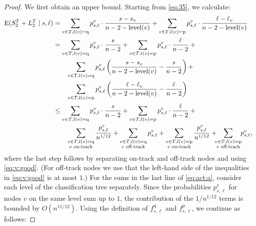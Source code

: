 \documentclass[prodmode,acmtalg]{acmsmall}
\newcommand{\E}{\textnormal{\textrm{E}}}
\begin{document}
\begin{proof}
    
    We first obtain an upper bound. Starting from \eqref{eq:35}, we
    calculate:
    \begin{align}
    \E(S_2^T + L_2^T \mid s, \ell) &=\sum_{v \in T, l(v) = \text{q}}
	p^v_{s,\ell}\cdot \frac{s - s_v}{n
	- 2 - \lv{v}}+ \sum_{v \in T, l(v) = \text{p}} p^v_{s,\ell} \cdot \frac{\ell -
	\ell_v}{n - 2 -
    \lv{v}}\notag\\
    &=\sum_{v \in T, l(v) = \text{q}}
	p^v_{s,\ell}\cdot\frac{s}{n
	- 2}+ \sum_{v \in T, l(v) = \text{p}} p^v_{s,\ell}
        \cdot\frac{\ell}{n - 2} {}+{}\notag\\ &\quad\quad\sum_{v \in T, l(v) = \text{q}}
	p^v_{s,\ell}\left( \frac{s - s_v}{n
	- 2 - \lv{v}} - \frac{s}{n-2} \right) + \notag\\ &\quad\quad\sum_{v \in T, l(v) = \text{p}} p^v_{s,\ell}
	\left( \frac{\ell -
    \ell_v}{n - 2 -
    \lv{v}}-\frac{\ell}{n-2}\right) \notag\\
	&\leq \sum_{v \in T, l(v) = \text{q}}
	p^v_{s,\ell}\cdot\frac{s}{n
	- 2}+ \sum_{v \in T, l(v) = \text{p}} p^v_{s,\ell}\cdot
        \frac{\ell}{n - 2}{}+{} \notag\\&\quad\quad\sum_{\substack{v \in T, l(v) = \text{q}\\v \text{ on-track}}}
    \frac{p^v_{s,\ell}}{n^{1/12}} + 
	\sum_{\substack{v \in T, l(v) = \text{q}\\v \text{ off-track}}} p^v_{s,\ell} + \sum_{\substack{v \in T, l(v) = \text{p}\\v \text{ on-track}}} 
    \frac{p^v_{s,
    \ell}}{n^{1/12}} +\!\!\! 
    \sum_{\substack{v \in T, l(v) = \text{p}\\v \text{ off-track}}} \!\!p^v_{s,\ell}, \label{eq:act:a}
\end{align}
where the last step follows by separating on-track and off-track nodes and using
\eqref{eq:v:good}.  (For off-track nodes we use that the left-hand side of the
inequalities in \eqref{eq:v:good} is at most $1$.) For the sums in the last line
of \eqref{eq:act:a}, consider each level of the classification tree separately.
Since the probabilities $p^v_{s,\ell}$ for nodes $v$ on the same level sum up to
$1$, the contribution of the $1/n^{1/12}$ terms is bounded by $O(n^{11/12})$. Using
the definition of $f^\text{q}_{s, \ell}$ and $f^\text{p}_{s,\ell}$, we continue
as follows:


\end{proof}
\end{document}
